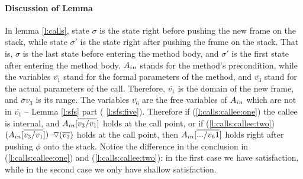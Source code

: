  

\paragraph{Discussion of Lemma} In lemma \ref{l:calls},   state $\sigma$ is the state right before pushing the new frame on the stack,   while 
state $\sigma'$ is the state right after pushing the frame on the stack.
That is, $\sigma$ is the last state before entering the method body, and $\sigma'$ is the first state after entering the method body.
$\Ain$ stands for the method's precondition, while the variables $\overline {v_1}$ stand for the formal parameters of the method,
and $\overline {v_3}$ stand for the actual parameters of the call.
Therefore, $\overline {v_1}$ is the domain of the new frame, and $\overline {\sigma} {v_3}$ is its range.
The variables $\overline {v_6}$ are the free variables of $\Ain$ which are not in  $\overline {v_1}$ -- \cf Lemma \ref{l:sfs} part
( \ref{l:sfs:five}).
Therefore if (\ref{l:calls:callee:one})  the callee is internal, and 
 $\Ain[\overline {v_3/v_1}]$ holds  at the call point, or
 if (\ref{l:calls:callee:two}) ${\PushASLong  {(\overline {v_3})} {(\Ain[\overline {v_3/v_1}])}}$
 holds  at the call point, 
 then $\Ain[\overline {.../v_61}]$  holds right after pushing $\phi$ onto the stack.
Notice the difference in the conclusion in (\ref{l:calls:callee:one}) and (\ref{l:calls:callee:two}): in the first case we have \strong satisfaction, while in the second case we only have shallow satisfaction.

